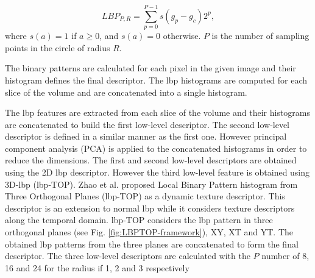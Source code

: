 \begin{equation} \label{Eq:LBP}
LBP_{P,R} = \sum_{p=0}^{P-1}s(g_{p} - g_{c})2^{p},
\end{equation}
where $s(a) = 1$ if $a \geq 0$, and $s(a)=0$ otherwise. $P$ is the number of sampling points in the circle of radius $R$.

The binary patterns are calculated for each pixel in the given image and their histogram defines the final descriptor.
The \ac{lbp} histograms are computed for each slice of the volume and are concatenated into a single histogram.




The \ac{lbp} features are extracted from each slice of the volume and their histograms are concatenated to build the first low-level descriptor. The second low-level descriptor is defined in a similar manner as the first one. However principal component analysis (PCA) is applied to the concatenated histograms in order to reduce the dimensions. The first and second low-level descriptors are obtained using the 2D \ac{lbp} descriptor. However the third low-level feature is obtained using 3D-\ac{lbp} (\ac{lbp}-TOP). Zhao et al. \cite{zhao2007dynamic} proposed Local Binary Pattern histogram from Three Orthogonal Planes (\ac{lbp}-TOP) as a dynamic texture descriptor. This descriptor is an extension to normal \ac{lbp} while it considers texture descriptors along the temporal domain. \ac{lbp}-TOP considers the \ac{lbp} pattern in three orthogonal planes (see Fig. \ref{fig:LBPTOP-framework}), XY, XT and YT. The obtained \ac{lbp} patterns from the three planes are concatenated to form the final descriptor. The three low-level descriptors are calculated with the $P$ number of 8, 16 and 24 for the radius if 1, 2 and 3 respectively


